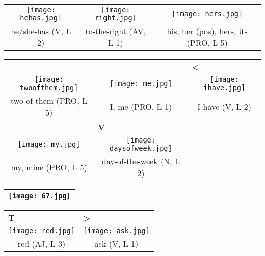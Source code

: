 \documentclass{tufte-book}
\newcommand{\sansnormal}{\sffamily\selectfont}
\begin{document}
\begin{fullwidth}
\begin{table*}[h!]
\begin{tabular}{ccc}
    \texttt{[image: hehas.jpg]}& \texttt{[image: right.jpg]}&\texttt{[image: hers.jpg]}\\
     he/she-has (V, L 2)& to-the-right (AV, L 1)& his, her (pos), hers, its (PRO, L 5)\\
     \end{tabular}
\end{table*}
 \newpage
 \begin{table*}[h!]
\begin{tabular}{ccc}
&  &\multicolumn{1}{l}{\textbf{<}}\\
   \texttt{[image: twoofthem.jpg]}& \texttt{[image: me.jpg]}&\texttt{[image: ihave.jpg]}\\
   two-of-them (PRO, L 5) & I, me (PRO, L 1) &I-have (V, L 2)\\%
    &\multicolumn{1}{l}{\sansnormal \textbf{V}}\\
   \texttt{[image: my.jpg]}& \texttt{[image: daysofweek.jpg]}&\\
   my, mine (PRO, L 5) & day-of-the-week (N, L 2) &\\%
 
 
 
\end{tabular}
\end{table*}

\begin{table}[h!]
\begin{tabular}{|c|}
\hline
\texttt{[image: 67.jpg]}\\
 
 \hline
\end{tabular}
\label{page:67}
\end{table}

 \begin{table*}[h!]
\begin{tabular}{cc}
 \multicolumn{1}{l}{\sansnormal\textbf{T}}&\multicolumn{1}{l}{\textbf{>}} \\
   \texttt{[image: red.jpg]}& \texttt{[image: ask.jpg]}\\
   red (AJ, L 3) & ask (V, L 1)\\%
 
 
 
\end{tabular}
\end{table*}


\end{fullwidth}
\end{document}
